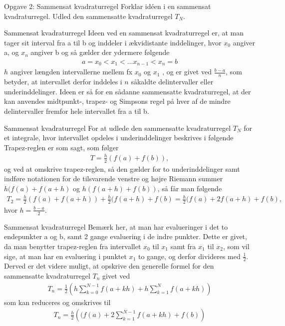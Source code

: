 \begin{frame}{Opgave 2: Sammensat kvadraturregel}
    Forklar idéen i en sammensat kvadraturregel. Udled den sammensatte kvadraturregel
    $T_N$.
\end{frame}

\begin{frame}{Sammensat kvadraturregel}
    Ideen ved en sammensat kvadraturregel er, at man tager sit interval fra a til b og inddeler i ækvidistante inddelinger, hvor $x_0$ angiver a, og $x_n$ angiver b og så gælder der ydermere følgende
    \begin{align*}
    a = x_0 < x_1 < … x_{n-1} < x_n = b
    \end{align*}
    $h$ angiver længden intervallerne mellem fx $x_0$ og $x_1$ , og er givet ved $\frac{b-a}{n}$, som betyder, at intervallet derfor inddeles i $n$ såkaldte delintervaller eller underinddelinger. 
    Ideen er så for en sådanne sammensatte kvadraturregel, at der kan anvendes midtpunkt-, trapez- og Simpsons regel på hver af de mindre delintervaller fremfor hele intervallet fra a til b. 
\end{frame}


\begin{frame}{Sammensat kvadraturregel}
    For at udlede den sammensatte kvadraturregel $T_N$ for et integrale, hvor intervallet opdeles i underinddelinger beskrives i følgende
    Trapez-reglen er som sagt, som følger
    \begin{align*}
    T = \frac{h}{2}(f(a)+f(b)),
    \end{align*}
    og ved at omskrive trapez-reglen, så den gælder for to underinddelinger samt indføre notationen for de tilsvarende venstre og højre Riemann summer $h(f(a)+f(a+h)$ og $h(f(a+h)+f(b))$, så får man følgende 
    \begin{align*}
    T_2=\frac{h}{2}(f(a)+f(a+h))+\frac{h}{2}(f(a+h)+f(b)= \frac{h}{2}(f(a)+2f(a+h)+f(b),
    \end{align*}
    hvor $h=\frac{b-a}{2}$.
\end{frame}


\begin{frame}{Sammensat kvadraturregel}
    Bemærk her, at man har evalueringer i det to endepunkter a og b, samt 2 gange evaluering i de indre punkter. Dette er givet, da man benytter trapez-reglen fra intervallet $x_0$ til $x_1$ samt fra $x_1$ til $x_2$, som vil sige, at man har en evaluering i punktet $x_1$ to gange, og derfor divideres med $\frac{1}{2}$. Derved er det videre muligt, at opskrive den generelle formel for den sammensatte kvadraturregel $T_n$ givet ved
    \begin{align*}
    T_n = \frac{1}{2}\left (  h\sum_{k=0}^{N-1}f(a+kh)+h\sum_{k=1}^{N}f(a+kh)\right )
    \end{align*}
    som kan reduceres og omskrives til 
    \begin{align*}
    T_n =\frac{h}{2}\left ((f(a)+2\sum_{k=1}^{N-1}f(a+kh)+f(b) \right )
    \end{align*}
\end{frame}

